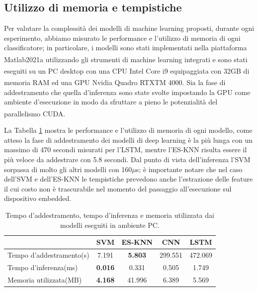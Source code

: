 \subsection{Utilizzo di memoria e tempistiche}
\label{ssec:utilizzo-di-memoria-e-tempistiche}

Per valutare la complessità dei modelli di machine learning proposti, durante ogni esperimento, abbiamo misurato le performance e l'utilizzo di memoria di ogni classificatore; in particolare, i modelli sono stati implementati nella piattaforma Matlab2021a\textsuperscript{\textregistered} utilizzando gli strumenti di machine learning integrati e sono stati eseguiti su un PC desktop con una CPU Intel\textsuperscript{\textregistered} Core i9 equipaggiata con 32GB di memoria RAM ed una GPU Nvidia\textsuperscript{\textregistered} Quadro\textsuperscript{\textregistered} RTXTM 4000. Sia la fase di addestramento che quella d'inferenza sono state svolte impostando la GPU come ambiente d'esecuzione in modo da sfruttare a pieno le potenzialità del parallelismo CUDA\textsuperscript{\textregistered}.

La Tabella \ref{tab:memory} mostra le performance e l'utilizzo di memoria di ogni modello, come atteso la fase di addestramento dei modelli di deep learning è la più lunga con un massimo di 470 secondi misurati per l'LSTM, mentre l'ES-KNN risulta essere il più veloce da addestrare con 5.8 secondi. Dal punto di vista dell'inferenza l'SVM sorpassa di molto gli altri modelli con 160$\mu$s; è importante notare che nel caso dell'SVM e dell'ES-KNN le tempistiche prevedono anche l'estrazione delle feature il cui costo non è trascurabile nel momento del passaggio all'esecuzione sul dispositivo embedded.

\begin{table}
    \centering
    \begin{tabular}{l c c c c}
        \hline
        & SVM & ES-KNN & CNN & LSTM \\
        \hline
        Tempo d'addestramento(s) & 7.191 & \textbf{5.803} & 299.551  & 472.069 \\
        Tempo d'inferenza(ms) & \textbf{0.016} & 0.331 & 0.505  & 1.749 \\
        Memoria utilizzata(MB) & \textbf{4.168} & 41.996& 6.389 & 5.569 \\
        \hline
    \end{tabular}
    \caption{Tempo d'addestramento, tempo d'inferenza e memoria utilizzata dai modelli eseguiti in ambiente PC.}
    \label{tab:memory}
\end{table}

